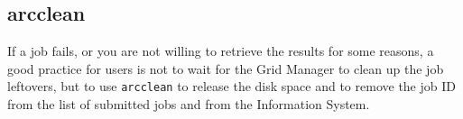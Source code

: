 

\subsection{arcclean}
\label{sec:arcclean}

If a job fails, or you are not willing to retrieve the results for
some reasons, a good practice for users is not to wait for the Grid
Manager to clean up the job leftovers, but to use \texttt{arcclean}
 to release the disk space
and to remove the job ID from the list of submitted jobs and from
the Information System.

